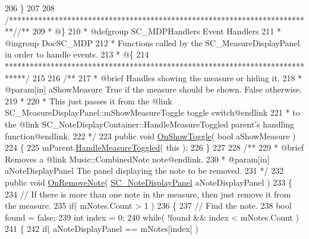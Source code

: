 \begin{DoxyCodeInclude}
206     \}
207 
208     \textcolor{comment}{/*************************************************************************/}\textcolor{comment}{/** }
209 \textcolor{comment}{    * @\}}
210 \textcolor{comment}{    * @defgroup SC\_MDPHandlers Event Handlers}
211 \textcolor{comment}{    * @ingroup DocSC\_MDP}
212 \textcolor{comment}{    * Functions called by the SC\_MeasureDisplayPanel in order to handle events.}
213 \textcolor{comment}{    * @\{}
214 \textcolor{comment}{    *****************************************************************************/}
215 \textcolor{comment}{}
216 \textcolor{comment}{    /**}
217 \textcolor{comment}{     * @brief Handles showing the measure or hiding it. }
218 \textcolor{comment}{     * @param[in] aShowMeasure True if the measure should be shown. False otherwise.}
219 \textcolor{comment}{     * }
220 \textcolor{comment}{     * This just passes it from the @link SC\_MeasureDisplayPanel::mShowMeasureToggle toggle switch@endlink }
221 \textcolor{comment}{     * to the @link SC\_NoteDisplayContainer::HandleMeasureToggled parent's handling function@endlink.}
222 \textcolor{comment}{    */}
223     \textcolor{keyword}{public} \textcolor{keywordtype}{void} \hyperlink{group___s_c___m_d_p_handlers_ga31c72fee5ddd5ae7b057b2f265341263}{OnShowToggle}( \textcolor{keywordtype}{bool} aShowMeasure )
224     \{
225         mParent.\hyperlink{group___s_c___n_d_c_handlers_ga458d57203645be514d3626211044b584}{HandleMeasureToggled}( \textcolor{keyword}{this} );
226     \}
227 \textcolor{comment}{}
228 \textcolor{comment}{    /**}
229 \textcolor{comment}{     * @brief Removes a @link Music::CombinedNote note@endlink.}
230 \textcolor{comment}{     * @param[in] aNoteDisplayPanel The panel displaying the note to be removed.}
231 \textcolor{comment}{    */} 
232     \textcolor{keyword}{public} \textcolor{keywordtype}{void} \hyperlink{group___s_c___m_d_p_handlers_gab48fa7fe4d7d4b29a3b0567be2b29849}{OnRemoveNote}( \hyperlink{class_s_c___note_display_panel}{SC\_NoteDisplayPanel} aNoteDisplayPanel )
233     \{
234         \textcolor{comment}{// If there is more than one note in the measure, then just remove it from the measure.}
235         \textcolor{keywordflow}{if}( mNotes.Count > 1 )
236         \{
237             \textcolor{comment}{// Find the note.}
238             \textcolor{keywordtype}{bool} found = \textcolor{keyword}{false};
239             \textcolor{keywordtype}{int} index = 0;
240             \textcolor{keywordflow}{while}( !found && index < mNotes.Count )
241             \{
242                 \textcolor{keywordflow}{if}( aNoteDisplayPanel == mNotes[index] )

\end{DoxyCodeInclude}
